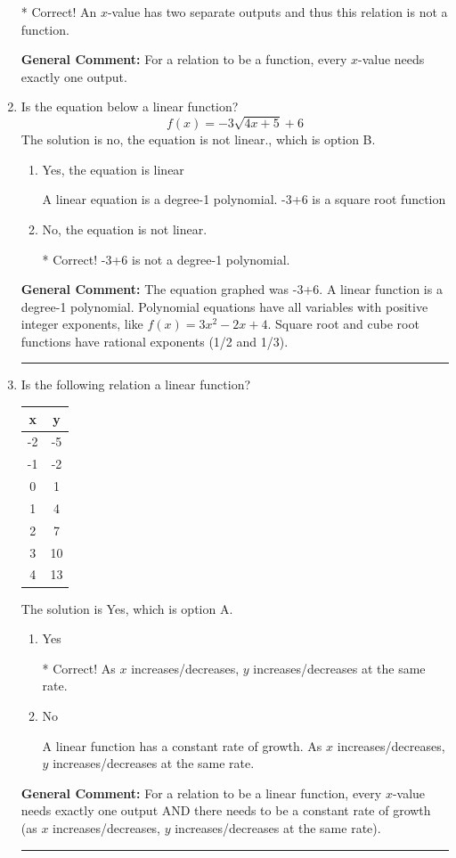 \documentclass{extbook}[14pt]
\newcommand{\litem}[1]{\item #1

\rule{\textwidth}{0.4pt}}
\begin{document}
\begin{enumerate}
{\begin{enumerate}[label=\Alph*.]
* Correct! An $x$-value has two separate outputs and thus this relation is not a function.
\end{enumerate}


\textbf{General Comment:} For a relation to be a function, every $x$-value needs exactly one output.
}
\litem{
Is the equation below a linear function?
\[ f(x) = {-3}\sqrt{4x + 5}+6 \]The solution is no, the equation is not linear., which is option B.

\begin{enumerate}[label=\Alph*.]
\item Yes, the equation is linear

A linear equation is a degree-1 polynomial. {-3}\sqrt{4x + 5}+6 is a square root function
\item No, the equation is not linear.

* Correct! {-3}\sqrt{4x + 5}+6 is not a degree-1 polynomial.
\end{enumerate}


\textbf{General Comment:} The equation graphed was {-3}\sqrt{4x + 5}+6. A linear function is a degree-1 polynomial. Polynomial equations have all variables with positive integer exponents, like $f(x) = 3x^2-2x+4$. Square root and cube root functions have rational exponents (1/2 and 1/3).
}
\litem{
Is the following relation a linear function?


\begin{tabular}{c|c}
x &y\tabularnewline \hline
-2 &-5\tabularnewline \hline
-1 &-2\tabularnewline \hline
0 &1\tabularnewline \hline
1 &4\tabularnewline \hline
2 &7\tabularnewline \hline
3 &10\tabularnewline \hline
4 &13\end{tabular}The solution is Yes, which is option A.

\begin{enumerate}[label=\Alph*.]
\item Yes

* Correct! As $x$ increases/decreases, $y$ increases/decreases at the same rate.
\item No

A linear function has a constant rate of growth. As $x$ increases/decreases, $y$ increases/decreases at the same rate.
\end{enumerate}


\textbf{General Comment:} For a relation to be a linear function, every $x$-value needs exactly one output AND there needs to be a constant rate of growth (as $x$ increases/decreases, $y$ increases/decreases at the same rate).
}
\end{enumerate}
\end{document}

